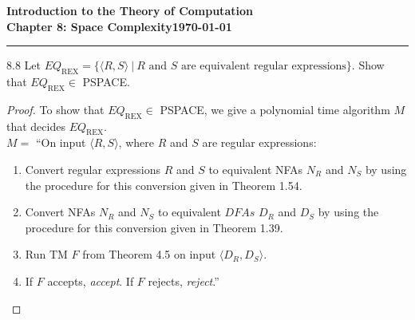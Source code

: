 \documentclass[11pt]{article}
\newcommand{\dated}{\today}
\begin{document}
\textbf{Introduction to the Theory of
Computation}\hfill\textbf{\myname}\\[0.01in]
\textbf{Chapter 8: Space Complexity}\hfill\textbf{\dated}\\
\smallskip\hrule\bigskip

\begin{problem}{8.8}
Let $EQ_{\text{REX}} = \{\langle R, S \rangle \ | \ R \text{ and } S \text{ are equivalent regular expressions}\}$. Show that $EQ_{\text{REX}} \in $ PSPACE.
\end{problem}

\begin{proof}
To show that $EQ_{\text{REX}} \in $ PSPACE, we give a polynomial time algorithm $M$ that decides $EQ_{\text{REX}}$. \\

$M =$ \textquotedblleft On input $\langle R, S \rangle$, where $R$ and $S$ are regular expressions:
\begin{enumerate}
\item Convert regular expressions $R$ and $S$ to equivalent NFAs $N_R$ and $N_S$ by using the procedure for this conversion given in Theorem 1.54.
\item Convert NFAs $N_R$ and $N_S$ to equivalent $DFAs$ $D_R$ and $D_S$ by using the procedure for this conversion given in Theorem 1.39.
\item Run TM $F$ from Theorem 4.5 on input $\langle D_R, D_S \rangle$.
\item If $F$ accepts, \textit{accept}. If $F$ rejects, \textit{reject}.\textquotedblright
\end{enumerate}

\end{proof}
\end{document}
